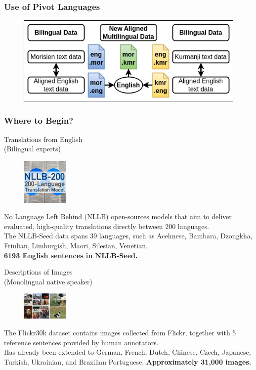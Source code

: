 \documentclass[aspectratio=169]{beamer}
\begin{document}
\begin{frame}[fragile]
	\frametitle{Use of Pivot Languages}
    \begin{figure}
	    \centering
	    \includegraphics[width=1.0\textwidth]{images/CRAMT-Tool-TextAlignments.png}
	\end{figure}
\end{frame}

\begin{frame}[fragile]
	\frametitle{Where to Begin?}
    \begin{minipage}{.50\textwidth}
    \centering
    Translations from English \\
    (Bilingual experts)
    \begin{figure}
        \includegraphics[width=0.2\textwidth]{images/nllb-logo.png} 
    \end{figure}
    \footnotesize 
    No Language Left Behind (NLLB) open-sources models that aim to deliver evaluated, high-quality translations directly between 200 languages. \\
    The NLLB-Seed data spans 39 languages, such as Acehnese, Bambara, Dzongkha, Friulian, Limburgish, Maori, Silesian, Venetian. \\
    \normalsize
    \textbf{6193 English sentences in NLLB-Seed.}
    \end{minipage}%
    \begin{minipage}{.50\textwidth}
    \centering
    Descriptions of Images \\
    (Monolingual native speaker)
    \begin{figure}
        \includegraphics[width=0.2\textwidth]{images/flickr30k-logo.png} 
    \end{figure}
    \footnotesize 
    The Flickr30k dataset contains images collected from Flickr, together with 5 reference sentences provided by human annotators. \\
    Has already been extended to German, French, Dutch, Chinese, Czech, Japanese, Turkish, Ukrainian, and Brazilian Portuguese.
    \normalsize
    \textbf{Approximately 31,000 images.}
    \end{minipage}
\end{frame}
\end{document}
